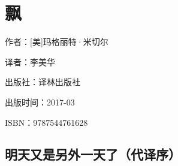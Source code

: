 

\section{飘}




\par 作者：[美]玛格丽特·米切尔
\par 译者：李美华
\par 出版社：译林出版社
\par 出版时间：2017-03
\par ISBN：9787544761628



\subsection{明天又是另外一天了（代译序）}

